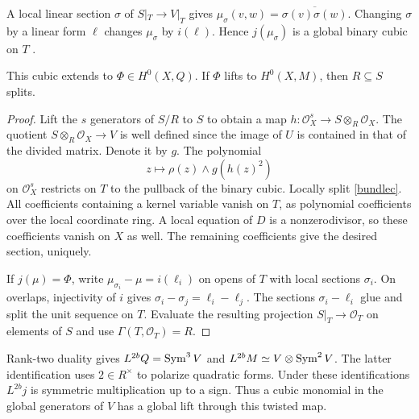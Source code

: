A local linear section $\sigma$ of $S|_T\to V|_T$ gives
$\mu_\sigma(v,w)=\overline{\sigma(v)\sigma(w)}$. Changing $\sigma$ by a linear form $\ell$ changes $\mu_\sigma$ by $i(\ell)$. Hence $j(\mu_\sigma)$ is a global binary cubic on $T$ \cite[Theorem~2.1]{Wood}.

\begin{lemma}\label{cubic-lifting}
This cubic extends to $\Phi\in H^0(X,Q)$. If $\Phi$ lifts to $H^0(X,M)$, then $R\subseteq S$ splits.
\end{lemma}
\begin{proof}
Lift the $s$ generators of $S/R$ to $S$ to obtain a map $h:\mathcal O_X^s\to S\otimes_R\mathcal O_X$. The quotient $S\otimes_R\mathcal O_X\to V$ is well defined since the image of $U$ is contained in that of the divided matrix. Denote it by $g$. The polynomial
\[
 z\longmapsto\rho(z)\wedge g(h(z)^2)
\]
on $\mathcal O_X^s$ restricts on $T$ to the pullback of the binary cubic. Locally split \eqref{bundlec}. All coefficients containing a kernel variable vanish on $T$, as polynomial coefficients over the local coordinate ring. A local equation of $D$ is a nonzerodivisor, so these coefficients vanish on $X$ as well. The remaining coefficients give the desired section, uniquely.

If $j(\mu)=\Phi$, write $\mu_{\sigma_i}-\mu=i(\ell_i)$ on opens of $T$ with local sections $\sigma_i$. On overlaps, injectivity of $i$ gives $\sigma_i-\sigma_j=\ell_i-\ell_j$. The sections $\sigma_i-\ell_i$ glue and split the unit sequence on $T$. Evaluate the resulting projection $S|_T\to\mathcal O_T$ on elements of $S$ and use $\Gamma(T,\mathcal O_T)=R$.
\end{proof}

Rank-two duality gives $L^{2b}Q=\operatorname{Sym}^3 V$ and
$L^{2b}M\simeq V\otimes\operatorname{Sym}^2 V$. The latter identification uses $2\in R^\times$ to polarize quadratic forms. Under these identifications $L^{2b}j$ is symmetric multiplication up to a sign. Thus a cubic monomial in the global generators of $V$ has a global lift through this twisted map.


